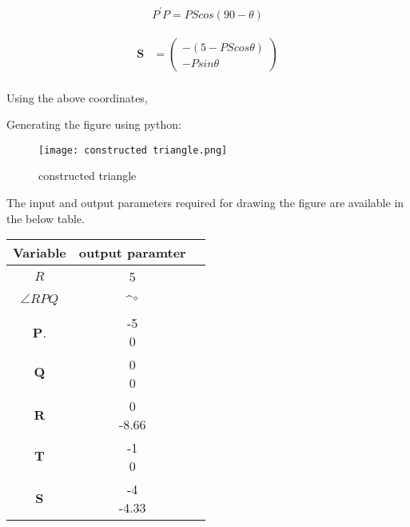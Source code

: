 \documentclass[a4paper,12pt,two column]{article}
\theoremstyle{remark}
\newcommand{\myvec}[1]{\ensuremath{\begin{pmatrix}#1\end{pmatrix}}}
\let\vec\mathbf
\begin{document}
\begin{align}
    P^\prime P = PS cos(90-\theta)
\end{align}    

\begin{align}
    \vec{S} &=\myvec{-(5 - PS cos\theta) \\ -P sin\theta}\\
\end{align}

Using the above coordinates,

Generating the figure using python:

\begin{figure}[bht]
    \centering
    \texttt{[image: constructed triangle.png]}
    \caption{constructed triangle}
    \label{fig:my_label}
\end{figure}

The input and output parameters required for drawing the figure are available in the below table.\\
\begin{table}[!h]
    \begin{tabular}{|c|c|c|} \hline
        \textbf{Variable}   & \textbf{output paramter}  \\ \hline
        $R$                 & 5 \\ \hline
        $\angle RPQ$        & \angle 60 ^$\degree$ \\ \hline    
        $\vec{P}$.          & \myvec{-5 \\ 0}\\ \hline
        $\vec{Q}$           & \myvec{0 \\ 0}\\ \hline
        $\vec{R}$           & \myvec{0 \\ -8.66}\\ \hline
        $\vec{T}$           & \myvec{-1\\0} \\\hline
        $\vec{S}$           & \myvec{-4 \\ -4.33} \\\hline
    \end{tabular}
\end{table}
\end{document}
